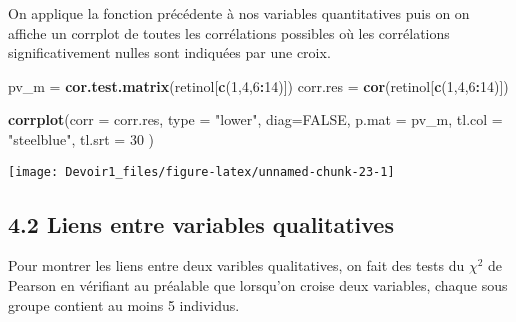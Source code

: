 \documentclass[]{article}
\newenvironment{Shaded}{\begin{snugshade}}{\end{snugshade}}
\newcommand{\KeywordTok}[1]{\textcolor[rgb]{0.13,0.29,0.53}{\textbf{#1}}}
\newcommand{\DataTypeTok}[1]{\textcolor[rgb]{0.13,0.29,0.53}{#1}}
\newcommand{\DecValTok}[1]{\textcolor[rgb]{0.00,0.00,0.81}{#1}}
\newcommand{\StringTok}[1]{\textcolor[rgb]{0.31,0.60,0.02}{#1}}
\newcommand{\OtherTok}[1]{\textcolor[rgb]{0.56,0.35,0.01}{#1}}
\newcommand{\OperatorTok}[1]{\textcolor[rgb]{0.81,0.36,0.00}{\textbf{#1}}}
\newcommand{\NormalTok}[1]{#1}
\begin{document}
On applique la fonction précédente à nos variables quantitatives puis on
on affiche un corrplot de toutes les corrélations possibles où les
corrélations significativement nulles sont indiquées par une croix.

\begin{Shaded}
\begin{Highlighting}[]
\NormalTok{pv_m =}\StringTok{ }\KeywordTok{cor.test.matrix}\NormalTok{(retinol[}\KeywordTok{c}\NormalTok{(}\DecValTok{1}\NormalTok{,}\DecValTok{4}\NormalTok{,}\DecValTok{6}\OperatorTok{:}\DecValTok{14}\NormalTok{)])}
\NormalTok{corr.res =}\StringTok{ }\KeywordTok{cor}\NormalTok{(retinol[}\KeywordTok{c}\NormalTok{(}\DecValTok{1}\NormalTok{,}\DecValTok{4}\NormalTok{,}\DecValTok{6}\OperatorTok{:}\DecValTok{14}\NormalTok{)])}
\end{Highlighting}
\end{Shaded}

\begin{Shaded}
\begin{Highlighting}[]
\KeywordTok{corrplot}\NormalTok{(}\DataTypeTok{corr =}\NormalTok{ corr.res,}
         \DataTypeTok{type =} \StringTok{"lower"}\NormalTok{, }
         \DataTypeTok{diag=}\OtherTok{FALSE}\NormalTok{,}
         \DataTypeTok{p.mat =}\NormalTok{ pv_m,}
         \DataTypeTok{tl.col =} \StringTok{"steelblue"}\NormalTok{, }\DataTypeTok{tl.srt =} \DecValTok{30}
\NormalTok{         )}
\end{Highlighting}
\end{Shaded}

\texttt{[image: Devoir1\_files/figure-latex/unnamed-chunk-23-1]}

\subsection{4.2 Liens entre variables
qualitatives}\label{liens-entre-variables-qualitatives}

Pour montrer les liens entre deux varibles qualitatives, on fait des
tests du \(\chi^2\) de Pearson en vérifiant au préalable que lorsqu'on
croise deux variables, chaque sous groupe contient au moins 5 individus.
\end{document}
